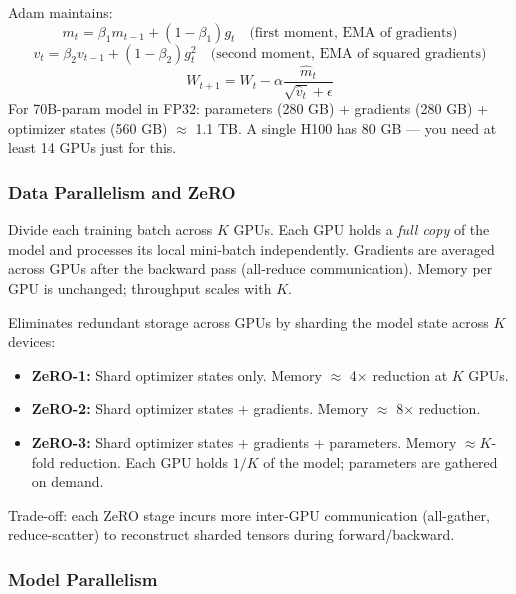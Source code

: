 \documentclass[11pt, a4paper]{article}
\begin{document}
\begin{mathbox}
Adam maintains:
\[
m_t = \beta_1 m_{t-1} + (1-\beta_1) g_t \quad \text{(first moment, EMA of gradients)}
\]
\[
v_t = \beta_2 v_{t-1} + (1-\beta_2) g_t^2 \quad \text{(second moment, EMA of squared gradients)}
\]
\[
W_{t+1} = W_t - \alpha \frac{\hat{m}_t}{\sqrt{\hat{v}_t} + \epsilon}
\]
For 70B-param model in FP32: parameters (280 GB) + gradients (280 GB) + optimizer states (560 GB) $\approx$ 1.1 TB. A single H100 has 80 GB --- you need at least 14 GPUs just for this.
\end{mathbox}

\subsubsection{Data Parallelism and ZeRO}

\begin{defbox}
Divide each training batch across $K$ GPUs. Each GPU holds a \emph{full copy} of the model and processes its local mini-batch independently. Gradients are averaged across GPUs after the backward pass (all-reduce communication). Memory per GPU is unchanged; throughput scales with $K$.
\end{defbox}

\begin{defbox}
Eliminates redundant storage across GPUs by sharding the model state across $K$ devices:
\begin{itemize}[leftmargin=1.5em]
  \item \textbf{ZeRO-1:} Shard optimizer states only. Memory $\approx$ 4$\times$ reduction at $K$ GPUs.
  \item \textbf{ZeRO-2:} Shard optimizer states + gradients. Memory $\approx$ 8$\times$ reduction.
  \item \textbf{ZeRO-3:} Shard optimizer states + gradients + parameters. Memory $\approx K$-fold reduction. Each GPU holds $1/K$ of the model; parameters are gathered on demand.
\end{itemize}
Trade-off: each ZeRO stage incurs more inter-GPU communication (all-gather, reduce-scatter) to reconstruct sharded tensors during forward/backward.
\end{defbox}

\subsubsection{Model Parallelism}
\end{document}
